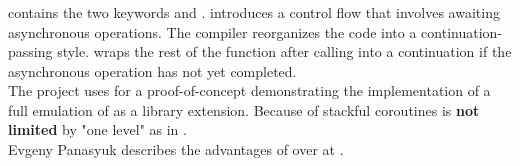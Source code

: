 \subsubsection*{\csharp \await}
\csharp contains the two keywords \async and \await. \async introduces a
control flow that involves awaiting asynchronous operations. The compiler
reorganizes the code into a continuation-passing style. \await wraps the rest
of the function after calling \await into a continuation if the asynchronous
operation has not yet completed.\\
The project \awaitemu uses \boostcoroutine for a proof-of-concept
demonstrating the implementation of a full emulation of \csharp \await as a
library extension. Because of stackful coroutines \await is \textbf{not limited}
by "one level" as in \csharp.\\
Evgeny Panasyuk describes the advantages of \boostcoroutine over \await at
\channelnine.
